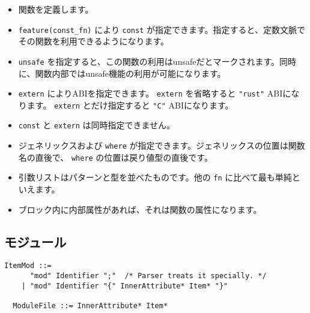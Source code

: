 \documentclass[dvipdfmx,uplatex,papersize,a4paper,10pt]{jsbook}
\theoremstyle{definition}
\begin{document}
\begin{itemize}
  \item 関数を定義します。
  \item \verb|feature(const_fn)| により \verb|const| が指定できます。指定すると、定数文脈でその関数を利用できるようになります。
  \item \verb|unsafe| を指定すると、この関数の利用はunsafeだとマークされます。同時に、関数内部ではunsafe機能の利用が可能になります。
  \item \verb|extern| によりABIを指定できます。 \verb|extern| を省略すると \verb|"rust"| ABIになります。 \verb|extern| とだけ指定すると \verb|"C"| ABIになります。
  \item \verb|const| と \verb|extern| は同時指定できません。
  \item ジェネリックスおよび \verb|where| が指定できます。ジェネリックスの位置は関数名の直後で、 \verb|where| の位置は戻り値型の直後です。
  \item 引数リストはパターンと型を並べたものです。他の \verb|fn| に比べて最も単純といえます。
  \item ブロック内に内部属性があれば、それは関数の属性になります。
\end{itemize}

\subsection{モジュール}

\begin{lstlisting}[language=BNFLike, gobble=2]
  ItemMod ::=
      "mod" Identifier ";"  /* Parser treats it specially. */
    | "mod" Identifier "{" InnerAttribute* Item* "}"

  ModuleFile ::= InnerAttribute* Item*
\end{lstlisting}
\end{document}
